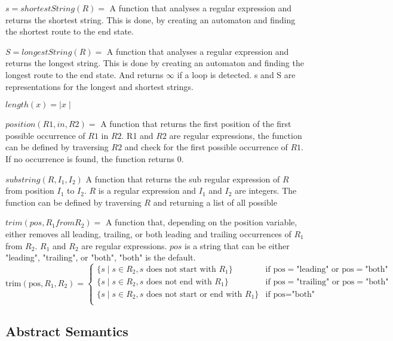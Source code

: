 $s = shortestString(R) =$ A function that analyses a regular expression and returns the shortest string. This is done, by creating an automaton and finding the shortest route to the end state.

$S = longestString(R) =$ A function that analyses a regular expression and returns the longest string. This is done by creating an automaton and finding the longest route to the end state. And returns $\infty$ if a loop is detected.
s and S are representations for the longest and shortest strings.

$length(x) = \mid x \mid $

$position(R1, in, R2) =$ A function that returns the first position of the first possible occurrence of $R1$ in $R2$.
R1 and $R2$ are regular expressions, the function can be defined by traversing $R2$ and check for the first possible occurrence of $R1$. If no occurrence is found, the function returns $0$.

$substring(R, I_1, I_2)$ A function that returns the sub regular expression of $R$ from position $I_1$ to $I_2$.
$R$ is a regular expression and $I_1$ and $I_2$ are integers. The function can be defined by traversing $R$ and returning a list of all possible


$trim(pos, R_1 from R_2) =$ A function that, depending on the position variable, either removes all leading, trailing, or both leading and trailing occurrences of $R_1$ from $R_2$.
$R_1$ and $R_2$ are regular expressions. $pos$ is a string that can be either "leading", "trailing", or "both", "both" is the default.
\[
    \text{trim}(\text{pos}, R_1, R_2) =
    \begin{cases}
        \{ s \mid s \in R_2, s \text{ does not start with } R_1 \}        & \text{if } \text{pos} = \text{"leading"} \text{ or } \text{pos} = \text{"both"}  \\
        \{ s \mid s \in R_2, s \text{ does not end with } R_1 \}          & \text{if } \text{pos} = \text{"trailing"} \text{ or } \text{pos} = \text{"both"} \\
        \{ s \mid s \in R_2, s \text{ does not start or end with } R_1 \} & \text{if } \text{pos} = \text{"both"}                                            \\
    \end{cases}
\]


\subsection{Abstract Semantics}

